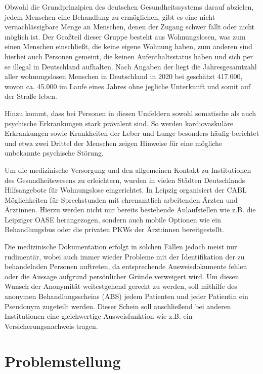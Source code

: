 Obwohl die Grundprinzipien des deutschen Gesundheitssystems darauf abzielen, jedem Menschen eine Behandlung zu ermöglichen, gibt es eine nicht vernachlässigbare Menge an Menschen, denen der Zugang schwer fällt oder nicht möglich ist. Der Großteil dieser Gruppe besteht aus Wohnungslosen, was zum einen Menschen einschließt, die keine eigene Wohnung haben, zum anderen sind hierbei auch Personen gemeint, die keinen Aufenthaltsstatus haben und sich per se illegal in Deutschland aufhalten. Nach Angaben der \citet{BAGWohnungslosenhilfe.2021} liegt die Jahresgesamtzahl aller wohnungslosen Menschen in Deutschland in 2020 bei geschätzt 417.000, wovon ca. 45.000 im Laufe eines Jahres ohne jegliche Unterkunft und somit auf der Straße leben.

Hinzu kommt, dass bei Personen in diesen Umfeldern sowohl somatische als auch psychische Erkrankungen stark prävalent sind. So werden kardiovaskuläre Erkrankungen sowie Krankheiten der Leber und Lunge besonders häufig berichtet und etwa zwei Drittel der Menschen zeigen Hinweise für eine mögliche unbekannte psychische Störung. \citep{DAE228829}

Um die medizinische Versorgung und den allgemeinen Kontakt zu Institutionen des Gesundheitswesens zu erleichtern, wurden in vielen Städten Deutschlands Hilfsangebote für Wohnungslose eingerichtet. In Leipzig organisiert der \ac{CABL} Möglichkeiten für Sprechstunden mit ehrenamtlich arbeitenden Ärzten und Ärztinnen. Hierzu werden nicht nur bereits bestehende Anlaufstellen wie z.B. die Leipziger OASE herangezogen, sondern auch mobile Optionen wie ein Behandlungsbus oder die privaten PKWs der Ärzt:innen bereitgestellt.

Die medizinische Dokumentation erfolgt in solchen Fällen jedoch meist nur rudimentär, wobei auch immer wieder Probleme mit der Identifikation der zu behandelnden Personen auftreten, da entsprechende Ausweisdokumente fehlen oder die Aussage aufgrund persönlicher Gründe verweigert wird. Um diesen Wunsch der Anonymität weitestgehend gerecht zu werden, soll mithilfe des anonymen Behandlungsscheins (\acs{ABS}) jedem Patienten und jeder Patientin ein Pseudonym zugeteilt werden. Dieser Schein soll anschließend bei anderen Institutionen eine gleichwertige Ausweisfunktion wie z.B. ein Versicherungsnachweis tragen. \citep{CABL}


\section{Problemstellung}

